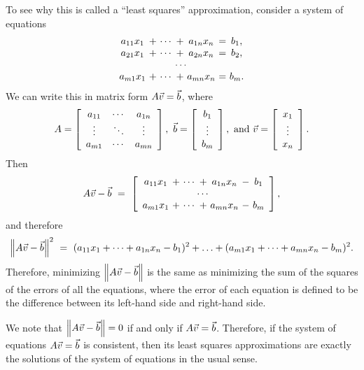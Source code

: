 \documentclass{ximera}
\begin{document}
To see why this is called a ``least squares'' approximation, consider
a system of equations
\begin{equation*}
  \begin{array}{c@{~}c@{~}c@{~}c@{~}c@{~}c@{~}c}
    a_{11}x_1 &+& \cdots &+& a_{1n}x_n &=& b_1, \\
    a_{21}x_1 &+& \cdots &+& a_{2n}x_n &=& b_2, \\
    \multicolumn{7}{c}{\cdots} \\
    a_{m1}x_1 &+& \cdots &+& a_{mn}x_n &=& b_m. \\
  \end{array}
\end{equation*}
We can write this in matrix form $A\vect{v}=\vect{b}$, where
\begin{equation*}
  A = \startmat{ccc}
    a_{11} & \cdots & a_{1n} \\
    \vdots & \ddots & \vdots \\
    a_{m1} & \cdots & a_{mn} \\
  \stopmat,
  \quad
  \vect{b} = \startmat{c} b_1 \\ \vdots \\ b_m \stopmat,
  \quad\mbox{and}\quad
  \vect{v} = \startmat{c} x_1 \\ \vdots \\ x_n \stopmat.
\end{equation*}
Then
\begin{equation*}
  A\vect{v} - \vect{b} ~=~
  \startmat{c@{~}c@{~}c@{~}c@{~}c@{~}c@{~}c}
    a_{11}x_1 &+& \cdots &+& a_{1n}x_n &-& b_1 \\
    \multicolumn{7}{c}{\cdots} \\
    a_{m1}x_1 &+& \cdots &+& a_{mn}x_n &-& b_m \\
  \stopmat,
\end{equation*}
and therefore
\begin{equation*}
  \norm{A\vect{v} - \vect{b}}^2 ~=~
  (a_{11}x_1 + \cdots + a_{1n}x_n - b_1)^2 + \ldots
  + (a_{m1}x_1 + \cdots + a_{mn}x_n - b_m)^2.
\end{equation*}
Therefore, minimizing $\norm{A\vect{v}-\vect{b}}$ is the same as
minimizing the sum of the squares of the errors of all the equations,
where the error of each equation is defined to be the difference
between its left-hand side and right-hand side.

We note that $\norm{A\vect{v}-\vect{b}}=0$ if and only if
$A\vect{v}=\vect{b}$. Therefore, if the system of equations
$A\vect{v}=\vect{b}$ is consistent, then its least squares
approximations are exactly the solutions of the system of equations in
the usual sense.
\end{document}
